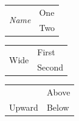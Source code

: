 \begin{tabular}{ll}
\multirow[t]{2}{*}{\emph{Name}} & One \\
& Two
\end{tabular}

\begin{tabular}{lll}
\multicolumn{2}{c}{\multirow{2}{*}{Wide}} & First \\
& & Second
\end{tabular}

\begin{tabular}{ll}
& Above \\
\multirow{-2}{*}{Upward} & Below
\end{tabular}

